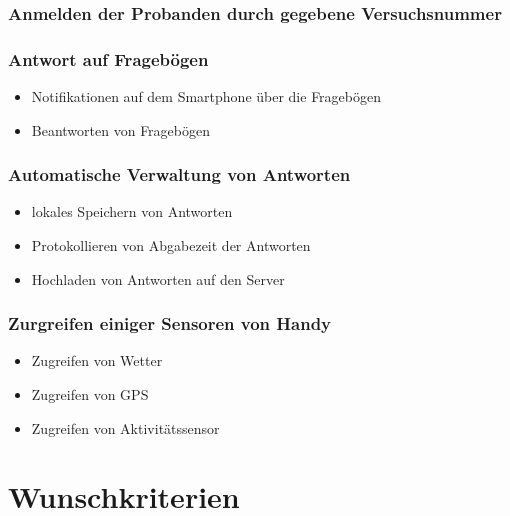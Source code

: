 \documentclass[a4paper]{scrreprt}
\begin{document}
                \subsubsection{Anmelden der \gls{Proband}en durch gegebene Versuchsnummer}

                \subsubsection{Antwort auf Frageb\"ogen}
                    \begin{itemize}
                        \item Notifikationen auf dem Smartphone über die Frageb\"ogen
                        \item Beantworten von Frageb\"ogen 
                    \end{itemize}

                \subsubsection{Automatische Verwaltung von Antworten}
                    \begin{itemize}
                        \item lokales Speichern von Antworten
                        \item Protokollieren von Abgabezeit der Antworten
                        \item Hochladen von Antworten auf den Server
                    \end{itemize}

                \subsubsection{Zurgreifen einiger Sensoren von Handy}
                    \begin{itemize}
                        \item Zugreifen von Wetter
                        \item Zugreifen von GPS
                        \item Zugreifen von Aktivitätssensor
                    \end{itemize}
                \vspace*{0.5cm}


        \section{Wunschkriterien}
\end{document}
